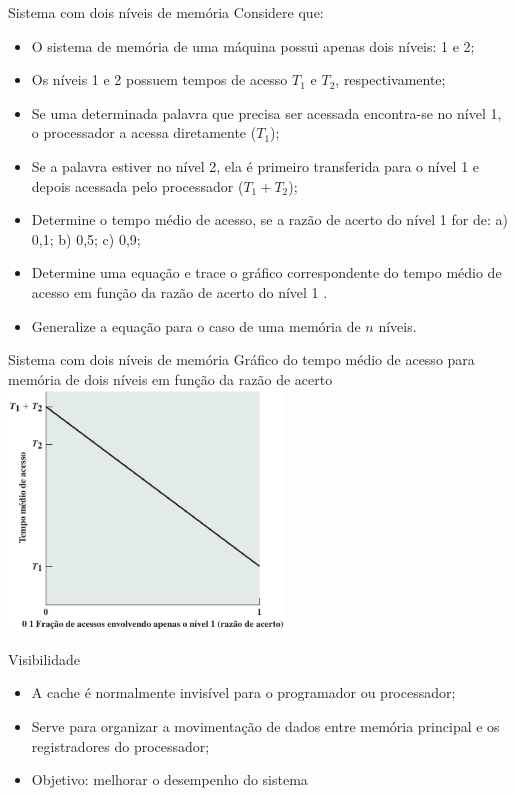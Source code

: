 \begin{slide}{Sistema com dois níveis de memória}
 Considere que:
    \begin{itemize}
       \item O sistema de memória de uma máquina possui apenas dois níveis: 1 e 2;
       \item Os níveis 1 e 2 possuem tempos de acesso $T_1$ e $T_2$, respectivamente;
       \item Se uma determinada palavra que precisa ser acessada encontra-se no nível 1, o processador a acessa diretamente ($T_1$);
       \item Se a palavra estiver no nível 2, ela é primeiro transferida para o nível 1 e depois acessada pelo processador ($T_1+T_2$);
       \item Determine o tempo médio de acesso, se a razão de acerto do nível 1 for de: a) 0,1; b) 0,5; c) 0,9;\pause
       \item Determine uma equação e trace o gráfico correspondente do tempo médio de acesso em função da razão de acerto do nível 1 .\pause
       \item Generalize a equação para o caso de uma memória de $n$ níveis.
    \end{itemize}
 \end{slide}
\begin{slide}{Sistema com dois níveis de memória}
	Gráfico do tempo médio de acesso para memória de dois níveis em função da razão de acerto\\
	\centering
	\includegraphics[width=0.55\textwidth]{figs/dois-niveis-grafico}
 \end{slide}

\begin{slide}{Visibilidade}
\begin{itemize}
   \item A cache é normalmente invisível para o programador ou processador;
   \item Serve para organizar a movimentação de dados entre memória principal e os registradores do processador;
   \item Objetivo: melhorar o desempenho do sistema
\end{itemize}
\end{slide}

